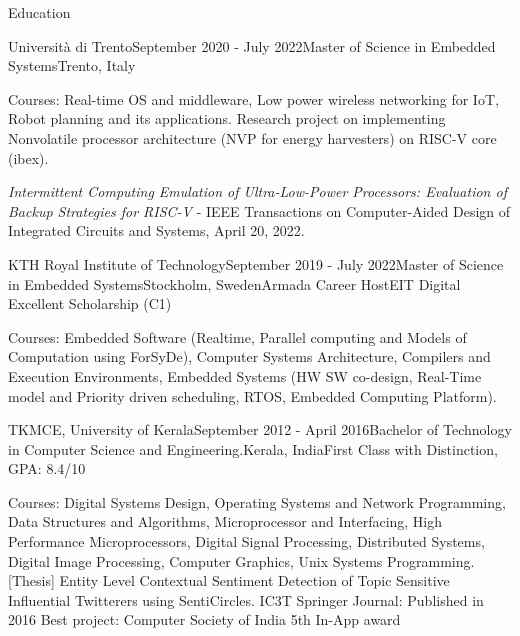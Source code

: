 \documentclass[
	a4paper, %
	11pt, %
]{resume} %
\begin{document}

\begin{rSection}{Education}
    \begin{rSubsection}{Università di Trento}{September 2020 - July 2022}{Master of Science in Embedded Systems}{Trento, Italy}

        Courses: Real-time OS and middleware, Low power wireless networking for IoT, Robot planning and its applications. Research project on implementing Nonvolatile processor architecture (NVP for energy harvesters) on RISC-V core (ibex).
    
        {\color{orange}\emph{Intermittent Computing Emulation of Ultra-Low-Power Processors: Evaluation of Backup Strategies for RISC-V} - IEEE Transactions on Computer-Aided Design of Integrated Circuits and Systems, April 20, 2022}.
    \end{rSubsection}

    \begin{rSubsection6}{KTH Royal Institute of Technology}{September 2019 - July 2022}{Master of Science in Embedded Systems}{Stockholm, Sweden}{Armada Career Host}{EIT Digital Excellent Scholarship (C1)}

        Courses: Embedded Software (Realtime, Parallel computing and Models of Computation using ForSyDe), Computer Systems Architecture, Compilers and Execution Environments, Embedded Systems (HW SW co-design, Real-Time model and Priority driven scheduling, RTOS, Embedded Computing Platform).
    \end{rSubsection6}
    
    \begin{rSubsection5}{TKMCE, University of Kerala}{September 2012 - April 2016}{Bachelor of Technology in Computer Science and Engineering.}{Kerala, India}{First Class with Distinction, GPA: 8.4/10}

        Courses: Digital Systems Design, Operating Systems and Network Programming, Data Structures and Algorithms, Microprocessor and Interfacing, High Performance Microprocessors, Digital Signal Processing, Distributed Systems, Digital Image Processing, Computer Graphics, Unix Systems Programming.\hfill
        \bigskip\break
        {\color{orange}[Thesis] Entity Level Contextual Sentiment Detection of Topic Sensitive Influential Twitterers using SentiCircles. \break
        IC3T Springer Journal: Published in 2016 \hfill \break
        Best project: Computer Society of India 5th In-App award} \hfill

    
    \end{rSubsection5}
    
		
\end{rSection}
\end{document}
